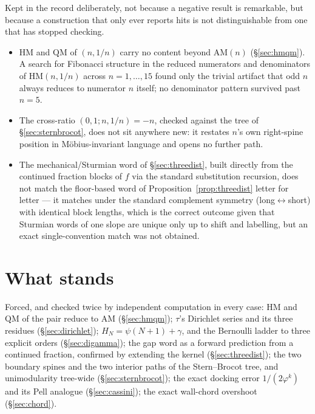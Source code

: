 \documentclass[10pt,a4paper]{article}
\theoremstyle{plain}
\theoremstyle{definition}
\theoremstyle{remark}
\begin{document}
Kept in the record deliberately, not because a negative result is remarkable, but because a construction that only ever reports hits is not distinguishable from one that has stopped checking.

\begin{itemize}
\item $\mathrm{HM}$ and $\mathrm{QM}$ of $(n,1/n)$ carry no content beyond $\mathrm{AM}(n)$ (\S\ref{sec:hmqm}). A search for Fibonacci structure in the reduced numerators and denominators of $\mathrm{HM}(n,1/n)$ across $n=1,\ldots,15$ found only the trivial artifact that odd $n$ always reduces to numerator $n$ itself; no denominator pattern survived past $n=5$.
\item The cross-ratio $(0,1;n,1/n)=-n$, checked against the tree of \S\ref{sec:sternbrocot}, does not sit anywhere new: it restates $n$'s own right-spine position in M\"obius-invariant language and opens no further path.
\item The mechanical/Sturmian word of \S\ref{sec:threedist}, built directly from the continued fraction blocks of $f$ via the standard substitution recursion, does not match the floor-based word of Proposition~\ref{prop:threedist} letter for letter --- it matches under the standard complement symmetry (long$\leftrightarrow$short) with identical block lengths, which is the correct outcome given that Sturmian words of one slope are unique only up to shift and labelling, but an exact single-convention match was not obtained.
\end{itemize}

\section{What stands}

Forced, and checked twice by independent computation in every case:
$\mathrm{HM}$ and $\mathrm{QM}$ of the pair reduce to $\mathrm{AM}$ (\S\ref{sec:hmqm});
$\tau$'s Dirichlet series and its three residues (\S\ref{sec:dirichlet});
$H_N=\psi(N+1)+\gamma$, and the Bernoulli ladder to three explicit orders (\S\ref{sec:digamma});
the gap word as a forward prediction from a continued fraction, confirmed by extending the kernel (\S\ref{sec:threedist});
the two boundary spines and the two interior paths of the Stern--Brocot tree, and unimodularity tree-wide (\S\ref{sec:sternbrocot});
the exact docking error $1/(2\varphi^{k})$ and its Pell analogue (\S\ref{sec:cassini});
the exact wall-chord overshoot (\S\ref{sec:chord}).
\end{document}

